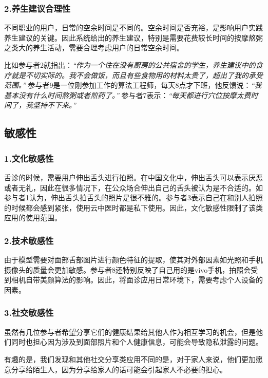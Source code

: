 \subsubsection{2.养生建议合理性}

不同职业的用户，日常的空余时间是不同的。空余时间是否充裕，是影响用户实践养生建议的关键。因此系统给出的养生建议，特别是需要花费较长时间的按摩熬粥之类大的养生活动，需要合理考虑用户的日常空余时间。

比如参与者2就指出：\textit{“作为一个住在没有厨房的公共宿舍的学生，养生建议中的食疗就是不切实际的。我不会做饭，而且有些食物用的材料太贵了，超出了我的承受范围。”}
参与者9是一位刚参加工作的算法工程师，每天8点才下班，他反馈说：\textit{“我基本没有什么时间熬粥或者煎药了。”} 参与者7表示：\textit{“每天都进行穴位按摩太费时间了，我坚持不下来。”}

\subsection{敏感性}
\subsubsection{1.文化敏感性}

舌诊的时候，需要用户伸出舌头进行拍照。在中国文化中，伸出舌头可以表示厌恶或者无礼，因此在很多情况下，在公众场合伸出自己的舌头被认为是不合适的。如参与者1认为，伸出舌头拍舌头的照片是很不雅的。参与者3表示自己在和别人拍照的时候都会感到紧张，使用云中医时都是私下使用。因此，文化敏感性限制了该类应用的使用范围。

\subsubsection{2.技术敏感性}

由于模型需要对面部舌部图片进行颜色特征的提取，使其对外部因素如光照和手机摄像头的质量会更加敏感。参与者8还特别反映了自己用的是vivo手机，拍照会受到相机自带美颜算法的影响。因此，将面诊应用日常环境下，需要考虑个人设备的因素。

\subsubsection{3.社交敏感性}

虽然有几位参与者希望分享它们的健康结果给其他人作为相互学习的机会，但是他们同时也担心因为涉及到面部照片和个人健康信息，可能会导致隐私泄露的问题。


有趣的是，我们发现和其他社交分享类应用不同的是，对于家人来说，他们更加愿意分享给陌生人，因为分享给家人的话可能会引起家人不必要的担心。


